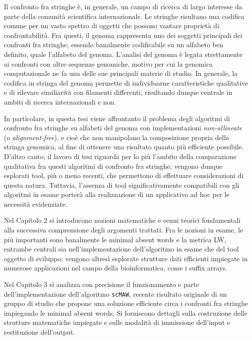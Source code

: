 Il confronto fra stringhe è, in generale, un campo di ricerca di largo interesse da parte della comunità scientifica internazionale. Le stringhe risultano una codifica comune per un vasto spettro di oggetti che possono vantare proprietà di confrontabilità. Fra questi, il genoma rappresenta uno dei soggetti  principali dei confronti fra stringhe, essendo banalmente codificabile su un alfabeto ben definito, quale l'alfabeto del genoma. L'analisi del genoma è legata strettamente ai confronti con altre sequenze genomiche, motivo per cui la genomica computazionale ne fa una delle sue principali materie di studio. In generale, la codifica in stringa del genoma permette di individuarne caratteristiche qualitative e di rilevare similiarità con filamenti differenti, risultando dunque centrale in ambiti di ricerca internazionali e non.

\vspace{3mm}

In particolare, in questa tesi viene affrontanto il problema degli algoritmi di confronto fra stringhe su alfabeti del genoma con implementazioni \textit{non-allineate} (o \textit{alignment-free}), e cioè che non manipolano la composizione propria della stringa genomica, al fine di ottenere una risultato quanto più efficiente possibile. D'altro canto, il lavoro di tesi riguarda per lo più l'ambito della comparazione qualitativa fra questi algoritmi di confronto fra stringhe; vengono dunque esplorati tool, più o meno recenti, che permettono di effettuare considerazioni di questa natura. Tuttavia, l'assenza di tool significativamente compatibili con gli algoritmi in esame porterà alla realizzazione di un applicativo ad hoc per le necessità evidenziate. 

\vspace{3mm}

Nel Capitolo 2 si introducono nozioni matematiche e cenni teorici fondamentali alla successiva comprensione degli argomenti trattati. Fra le nozioni in esame, le più importanti sono banalmente le minimal absent words e la metrica LW, entrambe centrali sia nell'implementazione dell'algoritmo in esame che del tool oggetto di sviluppo; vengono altresì esplorate strutture dati efficienti impiegate in numerose applicazioni nel campo della bioinformatica, come i suffix arrays.

Nel Capitolo 3 si analizza con precisione il funzionamento e parte dell'implementazione dell'algoritmo \verb|scMAW|, recente risultato originale di un gruppo di studio che propone una soluzione efficiente circa i confronti fra stringhe impiegando le minimal absent words. Si forniscono dettagli sulla costruzione delle strutture matematiche impiegate e sulle modalità di immissione dell'input e restituzione dell'output.

